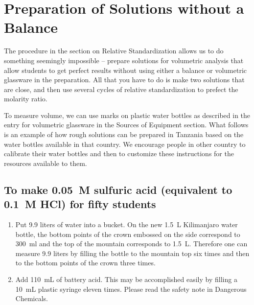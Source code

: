 \chapter{Preparation of Solutions without a Balance}

The procedure in the section on Relative Standardization allows us to do something seemingly impossible – prepare solutions for volumetric analysis that allow students to get perfect results without using either a balance or volumetric glassware in the preparation. All that you have to do is make two solutions that are close, and then use several cycles of relative standardization to prefect the molarity ratio. 

To measure volume, we can use marks on plastic water bottles as described in the entry for volumetric glassware in the Sources of Equipment section. What follows is an example of how rough solutions can be prepared in Tanzania based on the water bottles available in that country. We encourage people in other country to calibrate their water bottles and then to customize these instructions for the resources available to them.

\section{To make 0.05~M sulfuric acid (equivalent to 0.1~M HCl) for fifty students}
\begin{enumerate}
\item{Put 9.9 liters of water into a bucket. On the new 1.5~L Kilimanjaro water bottle, the bottom points of the crown embossed on the side correspond to 300~ml and the top of the mountain corresponds to 1.5~L. Therefore one can measure 9.9 liters by filling the bottle to the mountain top six times and then to the bottom points of the crown three times.}
\item{Add 110~mL of battery acid. This may be accomplished easily by filling a 10~mL plastic syringe eleven times. Please read the safety note in Dangerous Chemicals.}
\end{enumerate}

